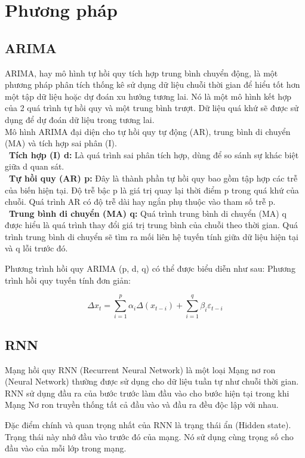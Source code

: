 \documentclass[conference]{IEEEtran}
\begin{document}
\section{Phương pháp}

\subsection{ARIMA}
ARIMA, hay mô hình tự hồi quy tích hợp trung bình chuyển động, là một phương pháp phân tích thống kê sử dụng dữ liệu chuỗi thời gian để hiểu tốt hơn một tập dữ liệu hoặc dự đoán xu hướng tương lai. Nó là một mô hình kết hợp của 2 quá trình tự hồi quy và một trung bình trượt. Dữ liệu quá khứ sẽ được sử dụng để dự đoán dữ liệu trong tương lai.\\
Mô hình ARIMA đại diện cho tự hồi quy tự động (AR), trung bình di chuyển (MA) và tích hợp sai phân (I). \\
\indent\textbullet\ \textbf{Tích hợp (I) d:} Là quá trình sai phân tích hợp, dùng để so sánh sự khác biệt giữa d quan sát.\\
\indent\textbullet\ \textbf{Tự hồi quy (AR) p:} Đây là thành phần tự hồi quy bao gồm tập hợp các trễ của biến hiện tại. Độ trễ bậc p là giá trị quay lại thời điểm p trong quá khứ của chuỗi. Quá trình AR có độ trễ dài hay ngắn phụ thuộc vào tham số trễ p.\\
\indent\textbullet\ \textbf{Trung bình di chuyển (MA) q:} Quá trình trung bình di chuyển (MA) q được hiểu là quá trình thay đổi giá trị trung bình của chuỗi theo thời gian. Quá trình trung bình di chuyển sẽ tìm ra mối liên hệ tuyến tính giữa dữ liệu hiện tại và q lỗi trước đó.

Phương trình hồi quy ARIMA (p, d, q) có thể được biểu diễn như sau:
Phương trình hồi quy tuyến tính đơn giản:
\begin{samepage}
\[\Delta x_t = \sum_{i=1}^{p} \alpha_i \Delta (x_{t-i}) +  \sum_{i=1}^{q} \beta_i \varepsilon_{t-i}\]
\end{samepage}

\subsection{RNN}
Mạng hồi quy RNN (Recurrent Neural Network) là một loại Mạng nơ ron (Neural Network) thường được sử dụng cho dữ liệu tuần tự như chuỗi thời gian. RNN sử dụng đầu ra của bước trước làm đầu vào cho bước hiện tại trong khi Mạng Nơ ron truyền thống tất cả đầu vào và đầu ra đều độc lập với nhau.

Đặc điểm chính và quan trọng nhất của RNN là trạng thái ẩn (Hidden state). Trạng thái này nhớ đầu vào trước đó của mạng. Nó sử dụng cùng trọng số cho đầu vào của mỗi lớp trong mạng.
\end{document}
